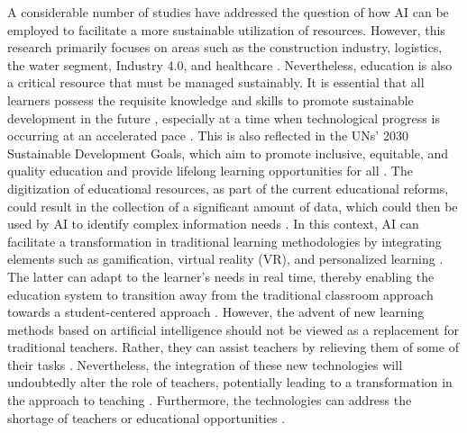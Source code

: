 \documentclass[]{lni}
\begin{document}
A considerable number of studies have addressed the question of how AI can be employed to facilitate a more sustainable utilization of resources. However, 
this research primarily focuses on areas such as the construction industry, logistics, the water segment, Industry 4.0, and healthcare 
\cite{KAR2022134120}.
%
Nevertheless, education is also a critical resource that must be managed sustainably. It is essential that all learners possess the requisite knowledge and 
skills to promote sustainable development in the future 
\cite{OFlaherty2018},
%
 especially at a time when technological progress is occurring at an accelerated pace \cite{Judijanto2022}.
%
This is also reflected in the UNs' 2030 Sustainable Development Goals, which aim to promote inclusive, equitable, and quality education and provide 
lifelong learning opportunities for all
\cite{un_sdg4}. 
%
The digitization of educational resources, as part of the current educational reforms, could result in the collection of a significant amount of data, 
which could then be used by AI to identify complex information needs 
\cite{KAMYAB2023101566} \cite{cai2021review}.
%
In this context, AI can facilitate a transformation in traditional learning methodologies by integrating elements such as gamification, 
virtual reality (VR), and personalized learning \cite{cai2021review} \cite{Judijanto2022}. The latter can adapt to the learner's needs in real time, 
thereby enabling the education system to transition away from the traditional classroom approach towards a student-centered approach 
\cite{Lin2023}. 
%
However, the advent of new learning methods based on artificial intelligence should not be viewed as a replacement for traditional teachers. Rather, they can assist 
teachers by relieving them of some of their tasks \cite{7742268} \cite{Lin2023} \cite{Tanveer2020}. Nevertheless, the integration of these new technologies will 
undoubtedly alter the role of teachers, potentially leading to a transformation in the approach to teaching 
\cite{Lin2023}.  
%
Furthermore, the technologies can address the shortage of teachers or educational opportunities \cite{cai2021review} \cite{Blanchard2015}.  
\end{document}
